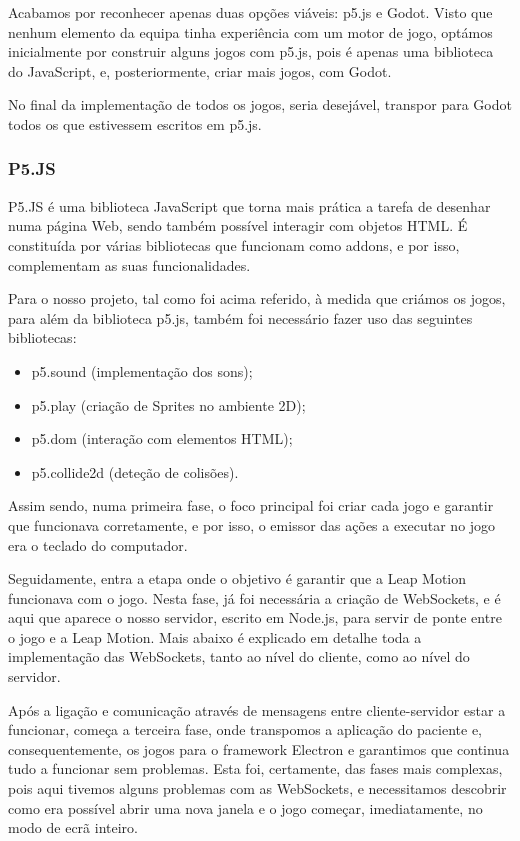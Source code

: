 \documentclass{TTUPhD}
\begin{document}
Acabamos por reconhecer apenas duas opções viáveis: p5.js e Godot. Visto que nenhum elemento da equipa tinha experiência com um motor de jogo, optámos inicialmente por construir alguns jogos com p5.js, pois é apenas uma biblioteca do JavaScript, e, posteriormente, criar mais jogos, com Godot.

No final da implementação de todos os jogos, seria desejável, transpor para Godot todos os que estivessem escritos em p5.js.

\subsubsection{P5.JS}

P5.JS é uma biblioteca JavaScript que torna mais prática a tarefa de desenhar numa página Web, sendo também possível interagir com objetos HTML. É constituída por várias bibliotecas que funcionam como addons, e por isso, complementam as suas funcionalidades.

Para o nosso projeto, tal como foi acima referido, à medida que criámos os jogos, para além da biblioteca p5.js, também foi necessário fazer uso das seguintes bibliotecas:

\begin{itemize}
    \item p5.sound (implementação dos sons);
    \item p5.play (criação de Sprites no ambiente 2D);
    \item p5.dom (interação com elementos HTML);
    \item p5.collide2d (deteção de colisões).
\end{itemize}

Assim sendo, numa primeira fase, o foco principal foi criar cada jogo e garantir que funcionava corretamente, e por isso,
o emissor das ações a executar no jogo era o teclado do computador.

Seguidamente, entra a etapa onde o objetivo é garantir que a Leap Motion funcionava com o jogo. Nesta fase, já foi necessária a criação de WebSockets, e é aqui que aparece o nosso servidor, escrito em Node.js, para servir de ponte entre o jogo e a Leap Motion. Mais abaixo é explicado em detalhe toda a implementação das WebSockets, tanto ao nível do cliente, como ao nível do servidor.

Após a ligação e comunicação através de mensagens entre cliente-servidor estar a funcionar, começa a terceira fase, onde transpomos a aplicação do paciente e, consequentemente, os jogos para o framework Electron e garantimos que continua tudo a funcionar sem problemas. Esta foi, certamente, das fases mais complexas, pois aqui tivemos alguns problemas com as WebSockets, e necessitamos descobrir como era possível abrir uma nova janela e o jogo começar, imediatamente, no modo de ecrã inteiro.
\end{document}
